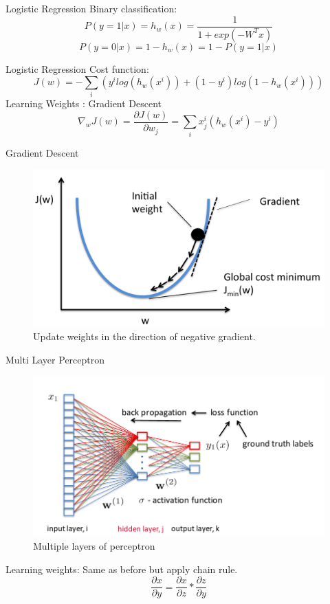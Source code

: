 ﻿\documentclass[table,aspectratio=43,mathserif,xcolor={usenames,dvipsnames,svgnames,table},10pt]{beamer}
\begin{document}
\begin{frame}{Logistic Regression}
Binary classification:
$$P(y = 1 | x) = h_w(x) = \frac{1}{1 + exp(-W^T x)}$$
$$P(y = 0 | x) = 1 - h_w(x) = 1 - P(y = 1 | x)$$
\end{frame}

\begin{frame}{Logistic Regression}
 Cost function: 
 $$ J(w) = - \sum_{i} ( y^i log(h_w(x^i)) + (1 - y^i) log(1 - h_w(x^i))  ) $$
 Learning Weights : Gradient Descent
 $$\nabla_w J(w) = \frac{\partial J(w)}{\partial w_j} = \sum_i x^i_j (h_w(x^i) - y^i) $$
\end{frame}

\begin{frame}{Gradient Descent}
\begin{figure}[h]
    \includegraphics[width=0.7\linewidth]{images/gd.png}  
    \caption{Update weights in the direction of negative gradient.}
  \end{figure}
\end{frame}

\begin{frame}{Multi Layer Perceptron}
\begin{figure}[h]
    \includegraphics[width=0.7\linewidth]{images/mlp.png}  
    \caption{Multiple layers of perceptron}
  \end{figure}
  Learning weights: Same as before but apply chain rule.
  $$ \frac{\partial x}{\partial y}  = \frac{\partial x}{\partial z} * \frac{\partial z}{\partial y} $$
\end{frame}
\end{document}
